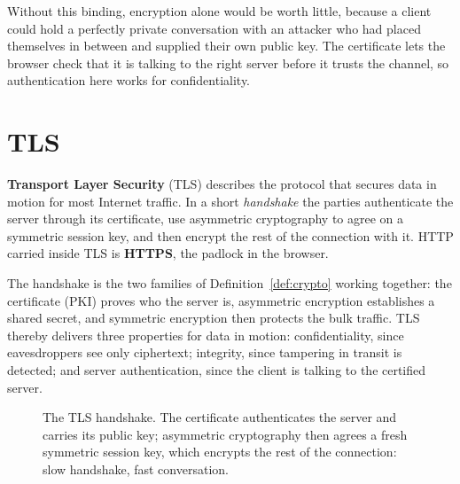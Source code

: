 Without this binding, encryption alone would be worth little, because a
client could hold a perfectly private conversation with an attacker who had
placed themselves in between and supplied their own public key. The
certificate lets the browser check that it is talking to the right server
before it trusts the channel, so authentication here works for
confidentiality.

\section{TLS}

\begin{definition}[TLS]\label{def:tls}
\textbf{Transport Layer Security} (TLS) describes the protocol that secures
data in motion for most Internet traffic. In a short \emph{handshake} the
parties authenticate the server through its certificate, use asymmetric
cryptography to agree on a symmetric session key, and then encrypt the rest
of the connection with it. HTTP carried inside TLS is \textbf{HTTPS}, the
padlock in the browser.
\end{definition}

The handshake is the two families of Definition~\ref{def:crypto} working
together: the certificate (PKI) proves who the server is, asymmetric
encryption establishes a shared secret, and symmetric encryption then
protects the bulk traffic. TLS thereby delivers three properties for data in
motion: confidentiality, since eavesdroppers see only ciphertext; integrity,
since tampering in transit is detected; and server authentication, since the
client is talking to the certified server.

\begin{figure}[htbp]
\centering
{}
\caption{The TLS handshake. The certificate authenticates the server and
carries its public key; asymmetric cryptography then agrees a fresh symmetric
session key, which encrypts the rest of the connection: slow handshake, fast
conversation.}
\label{fig:tls}
\end{figure}

